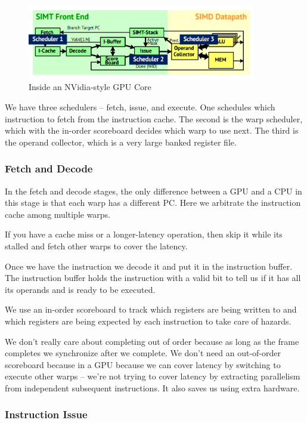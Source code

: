 \documentclass{article}
\begin{document}
 \begin{figure}[ht!]
\centering
\includegraphics[width=100mm]{img/gpucore2.png}
\caption{Inside an NVidia-style GPU Core}
\end{figure}

We have three schedulers -- fetch, issue, and execute. One schedules which instruction to fetch from the instruction cache. The second is the warp scheduler, which with the in-order scoreboard decides which warp to use next. The third is the operand collector, which is a very large banked register file. 

\subsubsection{Fetch and Decode}

In the fetch and decode stages, the only difference between a GPU and a CPU in this stage is that each warp has a different PC. Here we arbitrate the instruction cache among multiple warps. 

If you have a cache miss or a longer-latency operation, then skip it while its stalled and fetch other warps to cover the latency.

Once we have the instruction we decode it and put it in the instruction buffer. The instruction buffer holds the instruction with a valid bit to tell us if it has all its operands and is ready to be executed. 

We use an in-order scoreboard to track which registers are being written to and which registers are being expected by each instruction to take care of hazards. 

We don't really care about completing out of order because as long as the frame completes we synchronize after we complete. We don't need an out-of-order scoreboard because in a GPU because we can cover latency by switching to execute other warps -- we're not trying to cover latency by extracting parallelism from independent subsequent instructions. It also saves us using extra hardware.

\subsubsection{Instruction Issue}
\end{document}
